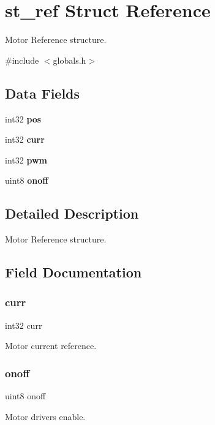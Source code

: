\section{st\+\_\+ref Struct Reference}
\label{structst__ref}


Motor Reference structure.  




{\ttfamily \#include $<$globals.\+h$>$}

\subsection*{Data Fields}
\begin{DoxyCompactItemize}
\item 
int32 \textbf{ pos}
\item 
int32 \textbf{ curr}
\item 
int32 \textbf{ pwm}
\item 
uint8 \textbf{ onoff}
\end{DoxyCompactItemize}


\subsection{Detailed Description}
Motor Reference structure. 



\subsection{Field Documentation}
\mbox{\label{structst__ref_adfe6e2bdca09ed7177204234bc2a6d26}} 
\subsubsection{curr}
{\footnotesize\ttfamily int32 curr}

Motor current reference. \mbox{\label{structst__ref_aea636dc117fd774b0cbfc5e936eac3e5}} 
\subsubsection{onoff}
{\footnotesize\ttfamily uint8 onoff}

Motor drivers enable. \mbox{\label{structst__ref_aa98fea17674bef3e67fbd014da075008}} 
